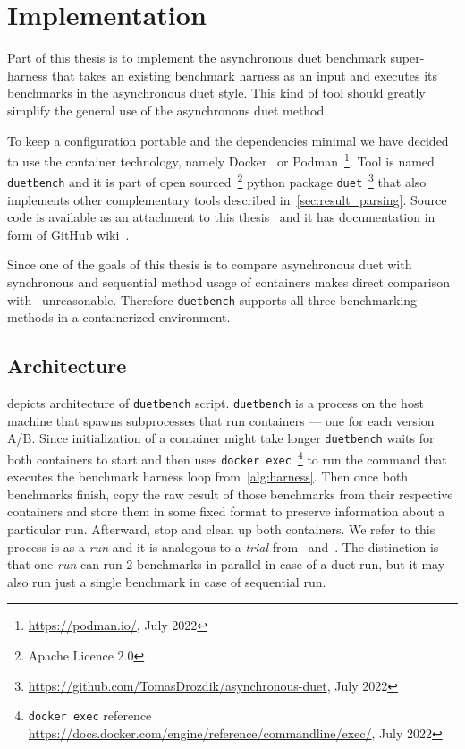 \chapter{Implementation}

Part of this thesis is to implement the asynchronous duet benchmark super-harness that takes an existing benchmark harness as an input and executes its benchmarks in the asynchronous duet style.
This kind of tool should greatly simplify the general use of the asynchronous duet method.

To keep a configuration portable and the dependencies minimal we have decided to use the container technology, namely Docker~\cite{merkel2014docker} or Podman~\footnote{\url{https://podman.io/}, July 2022}.
Tool is named \lstinline{duetbench} and it is part of open sourced~\footnote{Apache Licence 2.0} python package \lstinline{duet}~\footnote{\url{https://github.com/TomasDrozdik/asynchronous-duet}, July 2022} that also implements other complementary tools described in~\cref{sec:result_parsing}.
Source code is available as an attachment to this thesis~ and it has documentation in form of GitHub wiki~\cite{wiki}.

Since one of the goals of this thesis is to compare asynchronous duet with synchronous and sequential method usage of containers makes direct comparison with~\citet{bulej2020duet} unreasonable.
Therefore \lstinline{duetbench} supports all three benchmarking methods in a containerized environment.

\section{Architecture}

 depicts architecture of \lstinline{duetbench} script.
\lstinline{duetbench} is a process on the host machine that spawns subprocesses that run containers --- one for each version A/B.
Since initialization of a container might take longer \lstinline{duetbench} waits for both containers to start and then uses \lstinline{docker exec}~\footnote{\lstinline{docker exec} reference \url{https://docs.docker.com/engine/reference/commandline/exec/}, July 2022} to run the command that executes the benchmark harness loop from~\cref{alg:harness}.
Then once both benchmarks finish, copy the raw result of those benchmarks from their respective containers and store them in some fixed format to preserve information about a particular run.
Afterward, stop and clean up both containers.
We refer to this process is as a \emph{run} and it is analogous to a \emph{trial} from~\citet{laaber2019software} and~\citet{abedi2017conducting}.
The distinction is that one \emph{run} can run 2 benchmarks in parallel in case of a duet run, but it may also run just a single benchmark in case of sequential run.

